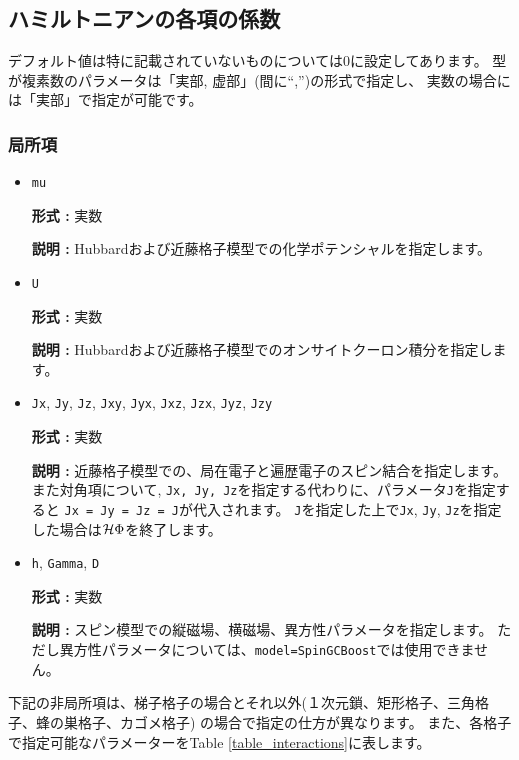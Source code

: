 \subsection{ハミルトニアンの各項の係数}

デフォルト値は特に記載されていないものについては0に設定してあります。
型が複素数のパラメータは「実部, 虚部」(間に``,'')の形式で指定し、
実数の場合には「実部」で指定が可能です。

\subsubsection{局所項}

\begin{itemize}

\item \verb|mu|

{\bf 形式 :} 実数

{\bf 説明 :} Hubbardおよび近藤格子模型での化学ポテンシャルを指定します。

\item \verb|U|

{\bf 形式 :} 実数

{\bf 説明 :} Hubbardおよび近藤格子模型でのオンサイトクーロン積分を指定します。

\item \verb|Jx|, \verb|Jy|, \verb|Jz|, \verb|Jxy|, 
  \verb|Jyx|, \verb|Jxz|, \verb|Jzx|, \verb|Jyz|, \verb|Jzy|

{\bf 形式 :} 実数

{\bf 説明 :} 近藤格子模型での、局在電子と遍歴電子のスピン結合を指定します。
また対角項について, \verb|Jx, Jy, Jz|を指定する代わりに、パラメータ\verb|J|を指定すると
\verb|Jx = Jy = Jz = J|が代入されます。
\verb|J|を指定した上で\verb|Jx|, \verb|Jy|, \verb|Jz|を指定した場合は$\mathcal{H} \Phi$を終了します。

\item \verb|h|, \verb|Gamma|, \verb|D|

{\bf 形式 :} 実数

{\bf 説明 :} スピン模型での縦磁場、横磁場、異方性パラメータを指定します。
ただし異方性パラメータについては、\verb|model=SpinGCBoost|では使用できません。

\end{itemize}

下記の非局所項は、梯子格子の場合とそれ以外(１次元鎖、矩形格子、三角格子、蜂の巣格子、カゴメ格子)
の場合で指定の仕方が異なります。
また、各格子で指定可能なパラメーターをTable \ref{table_interactions}に表します。

